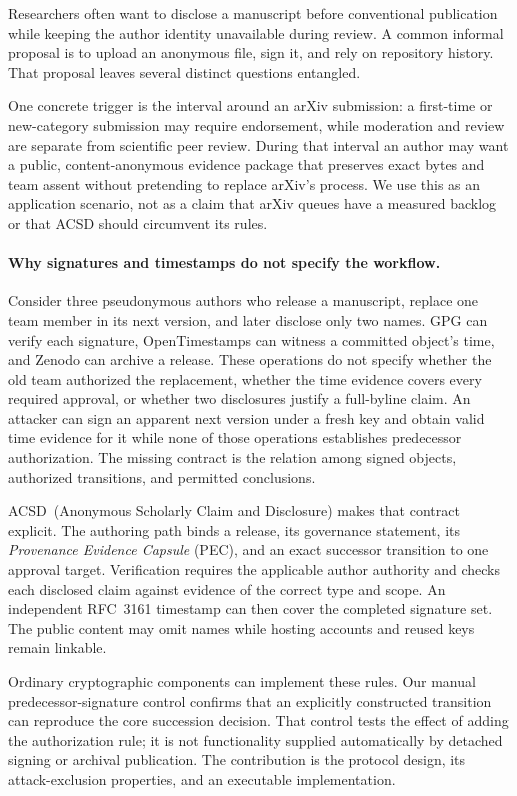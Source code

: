 \documentclass[acmsmall,screen,review,nonacm]{acmart}
\newcommand{\acsd}{\textsc{ACSD}}
\begin{document}
Researchers often want to disclose a manuscript before conventional publication while keeping the author identity unavailable during review. A common informal proposal is to upload an anonymous file, sign it, and rely on repository history. That proposal leaves several distinct questions entangled.

One concrete trigger is the interval around an arXiv submission: a first-time or
new-category submission may require endorsement, while moderation and review
are separate from scientific peer review. During that interval an author may
want a public, content-anonymous evidence package that preserves exact bytes
and team assent without pretending to replace arXiv's process. We use this as
an application scenario, not as a claim that arXiv queues have a measured
backlog or that ACSD should circumvent its rules.

\paragraph{Why signatures and timestamps do not specify the workflow.}
Consider three pseudonymous authors who release a manuscript, replace one team
member in its next version, and later disclose only two names. GPG can verify
each signature, OpenTimestamps can witness a committed object's time, and
Zenodo can archive a release. These operations do not specify whether the old
team authorized the replacement, whether the time evidence covers every
required approval, or whether two disclosures justify a full-byline claim.
An attacker can sign an apparent next version under a fresh key and obtain
valid time evidence for it while none of those operations establishes
predecessor authorization. The missing contract is the relation among signed
objects, authorized transitions, and permitted conclusions.

\acsd\ (Anonymous Scholarly Claim and Disclosure) makes that contract explicit.
The authoring path binds a release, its governance statement, its
\emph{Provenance Evidence Capsule} (PEC), and an exact successor transition to
one approval target. Verification requires the applicable author authority and
checks each disclosed claim against evidence of the correct type and scope.
An independent RFC~3161 timestamp can then cover the completed signature set.
The public content may omit names while hosting accounts and reused keys
remain linkable.

Ordinary cryptographic components can implement these rules. Our manual
predecessor-signature control confirms that an explicitly constructed transition
can reproduce the core succession decision. That control tests the effect of
adding the authorization rule; it is not functionality supplied automatically
by detached signing or archival publication. The contribution is the protocol
design, its attack-exclusion properties, and an executable implementation.
\end{document}
